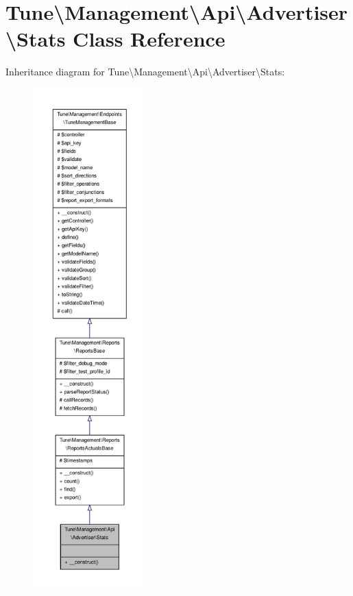 \hypertarget{classTune_1_1Management_1_1Api_1_1Advertiser_1_1Stats}{\section{Tune\textbackslash{}Management\textbackslash{}Api\textbackslash{}Advertiser\textbackslash{}Stats Class Reference}
\label{classTune_1_1Management_1_1Api_1_1Advertiser_1_1Stats}
}


Inheritance diagram for Tune\textbackslash{}Management\textbackslash{}Api\textbackslash{}Advertiser\textbackslash{}Stats\-:
\nopagebreak
\begin{figure}[H]
\begin{center}
\leavevmode
\includegraphics[height=550pt]{classTune_1_1Management_1_1Api_1_1Advertiser_1_1Stats__inherit__graph}
\end{center}
\end{figure}


